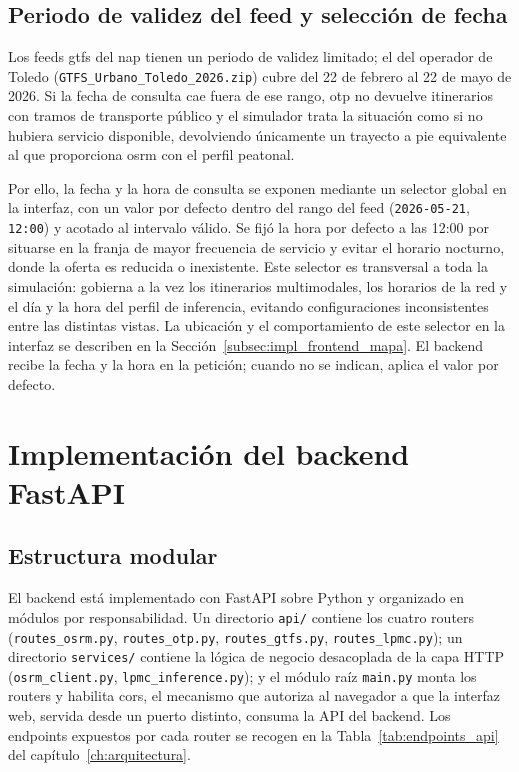 \subsection{Periodo de validez del feed y selección de fecha}
\label{subsec:impl_otp_fecha}

Los feeds \gls{gtfs} del \gls{nap} tienen un periodo de validez limitado; el del operador de Toledo (\texttt{GTFS\_Urbano\_Toledo\_2026.zip}) cubre del 22 de febrero al 22 de mayo de 2026. Si la fecha de consulta cae fuera de ese rango, \gls{otp} no devuelve itinerarios con tramos de transporte público y el simulador trata la situación como si no hubiera servicio disponible, devolviendo únicamente un trayecto a pie equivalente al que proporciona \gls{osrm} con el perfil peatonal.\newline
\vspace{-3mm}

Por ello, la fecha y la hora de consulta se exponen mediante un selector global en la interfaz, con un valor por defecto dentro del rango del feed (\texttt{2026-05-21}, \texttt{12:00}) y acotado al intervalo válido. Se fijó la hora por defecto a las 12:00 por situarse en la franja de mayor frecuencia de servicio y evitar el horario nocturno, donde la oferta es reducida o inexistente. Este selector es transversal a toda la simulación: gobierna a la vez los itinerarios multimodales, los horarios de la red y el día y la hora del perfil de inferencia, evitando configuraciones inconsistentes entre las distintas vistas. La ubicación y el comportamiento de este selector en la interfaz se describen en la Sección~\ref{subsec:impl_frontend_mapa}. El backend recibe la fecha y la hora en la petición; cuando no se indican, aplica el valor por defecto.
\vspace{-5mm}

\section{Implementación del backend FastAPI}
\label{sec:impl_backend}
\vspace{-5mm}
\subsection{Estructura modular}
\label{subsec:impl_backend_estructura}

El backend está implementado con FastAPI sobre Python y organizado en módulos por responsabilidad. Un directorio \texttt{api/} contiene los cuatro routers (\texttt{routes\_osrm.py}, \texttt{routes\_otp.py}, \texttt{routes\_gtfs.py}, \texttt{routes\_lpmc.py}); un directorio \texttt{services/} contiene la lógica de negocio desacoplada de la capa HTTP (\texttt{osrm\_client.py}, \texttt{lpmc\_inference.py}); y el módulo raíz \texttt{main.py} monta los routers y habilita \gls{cors}, el mecanismo que autoriza al navegador a que la interfaz web, servida desde un puerto distinto, consuma la API del backend. Los endpoints expuestos por cada router se recogen en la Tabla~\ref{tab:endpoints_api} del capítulo~\ref{ch:arquitectura}.\newline

